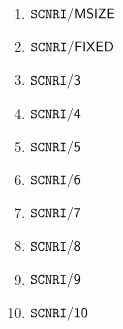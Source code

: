 \begin{enumerate}
	\item $\texttt{SCNRI}\textsf{/}{\textsf{MSIZE}}                         $
	\item $\texttt{SCNRI}\textsf{/}{\textsf{FIXED}}         $
	\item $\texttt{SCNRI}\textsf{/}{\textsf{3}} $
	\item $\texttt{SCNRI}\textsf{/}{\textsf{4}} $
	\item $\texttt{SCNRI}\textsf{/}{\textsf{5}} $
	\item $\texttt{SCNRI}\textsf{/}{\textsf{6}} $
	\item $\texttt{SCNRI}\textsf{/}{\textsf{7}}                         $
	\item $\texttt{SCNRI}\textsf{/}{\textsf{8}}                      $
	\item $\texttt{SCNRI}\textsf{/}{\textsf{9}}                          $
	\item $\texttt{SCNRI}\textsf{/}{\textsf{10}}                       $
\end{enumerate}

